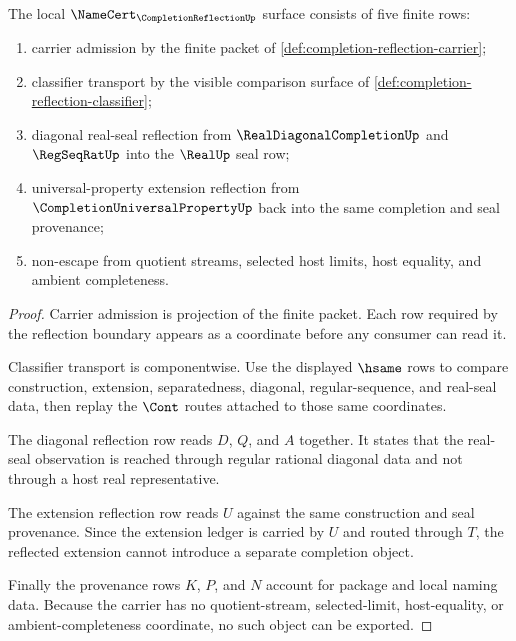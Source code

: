\begin{theorem}
\label{thm:completion-reflection-namecert-obligations}
The local $\NameCert_{\CompletionReflectionUp}$ surface consists of five finite rows:
\begin{enumerate}
\item carrier admission by the finite packet of \autoref{def:completion-reflection-carrier};
\item classifier transport by the visible comparison surface of \autoref{def:completion-reflection-classifier};
\item diagonal real-seal reflection from $\RealDiagonalCompletionUp$ and $\RegSeqRatUp$ into the $\RealUp$ seal row;
\item universal-property extension reflection from $\CompletionUniversalPropertyUp$ back into the same completion and seal provenance;
\item non-escape from quotient streams, selected host limits, host equality, and ambient completeness.
\end{enumerate}
\end{theorem}
\begin{proof}
Carrier admission is projection of the finite packet. Each row required by the reflection boundary appears as a coordinate before any consumer can read it.

Classifier transport is componentwise. Use the displayed $\hsame$ rows to compare construction, extension, separatedness, diagonal, regular-sequence, and real-seal data, then replay the $\Cont$ routes attached to those same coordinates.

The diagonal reflection row reads $D$, $Q$, and $A$ together. It states that the real-seal observation is reached through regular rational diagonal data and not through a host real representative.

The extension reflection row reads $U$ against the same construction and seal provenance. Since the extension ledger is carried by $U$ and routed through $T$, the reflected extension cannot introduce a separate completion object.

Finally the provenance rows $K$, $P$, and $N$ account for package and local naming data. Because the carrier has no quotient-stream, selected-limit, host-equality, or ambient-completeness coordinate, no such object can be exported.
\end{proof}

